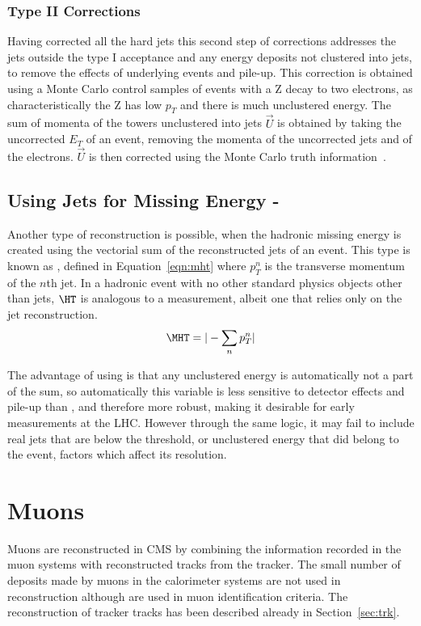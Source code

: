 \subsubsection{Type II Corrections}

Having corrected all the hard jets this second step of corrections addresses the jets outside the type I acceptance and any energy deposits not clustered into jets, to remove the effects of underlying events and pile-up. This correction is obtained using a Monte Carlo control samples of events with a Z decay to two electrons, as characteristically the Z has low $p_{T}$ and there is much unclustered energy. The sum of momenta of the towers unclustered into jets $\vec{U}$ is obtained by taking the uncorrected $E_{T}$ of an event, removing the momenta of the uncorrected jets and of the electrons. $\vec{U}$ is then corrected using the Monte Carlo truth information~\cite{JME-10-004}. 


\subsection{Using Jets for Missing Energy - \MHT}

Another type of \met reconstruction is possible, when the hadronic missing energy is created using the vectorial sum of the reconstructed jets of an event. This type is known as \MHT, defined in Equation~\ref{eqn:mht} where $p_{T}^{n}$ is the transverse momentum of the $n$th jet.  In a hadronic event with no other standard physics objects other than jets, $\HT$ is analogous to a \met measurement, albeit one that relies only on the jet reconstruction. 
\begin{equation}
\MHT = | - \sum_{n} p_{T}^{n}|
\label{eqn:mht}
\end{equation}

The advantage of using \MHT is that any unclustered energy is automatically not a part of the sum, so automatically this variable is less sensitive to detector effects and pile-up than \met, and therefore more robust, making it desirable for early measurements at the LHC. However through the same logic, it may fail to include real jets that are below the threshold, or unclustered energy that did belong to the event, factors which affect its resolution. 

\section{Muons}
\label{sec:muona}
Muons are reconstructed in CMS by combining the information recorded in the muon systems with reconstructed tracks from the tracker. The small number of deposits made by muons in the calorimeter systems are not used in reconstruction although are used in muon identification criteria. The reconstruction of tracker tracks has been described already in Section~\ref{sec:trk}. 

